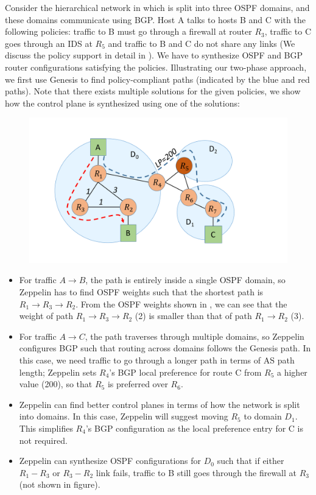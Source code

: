 Consider the hierarchical network in  which
is split into three OSPF domains, and these domains communicate
using BGP. Host A talks to hosts B and C with the following policies:
traffic to B must go through a firewall at router $R_3$, traffic to C 
goes through an IDS at $R_5$ and traffic 
to B and C do not share any links (We discuss the policy support in
detail in ). We 
have to synthesize OSPF and BGP router configurations satisfying the 
policies. Illustrating our two-phase approach, we first 
use Genesis to find policy-compliant paths (indicated by the blue and
red paths). Note that there exists multiple solutions for the given
policies, we show how the control plane is 
synthesized using one of the solutions:
\begin{figure}
	\includegraphics[width=0.75\columnwidth]{figures/example.pdf}
	\label{fig:example}
\end{figure}

\begin{itemize}
	\item
For traffic $A \rightarrow B$, the path is entirely inside
a single OSPF domain, so Zeppelin has to find OSPF weights 
such that the shortest path is $R_1 \rightarrow R_3 \rightarrow 
R_2$. From the OSPF weights shown in , 
we can see that the weight of path $R_1 
\rightarrow R_3 \rightarrow R_2$ (2) is smaller than that of path
$R_1 \rightarrow R_2$ (3). 
 	\item For traffic $A \rightarrow C$, the path traverses through 
 	multiple domains, so Zeppelin configures BGP such that 
 	routing across domains follows the Genesis path. In this case, 
 	we need traffic to go through a longer path in terms of AS path
 	length; Zeppelin sets $R_4$'s BGP local preference for route C
 	from $R_5$ a higher value (200), so that $R_5$ is 
 	preferred over $R_6$. 
 	\item Zeppelin can find better control planes in terms of how 
 	the network is split into domains. In this case,  
 	Zeppelin will suggest moving $R_5$ to domain $D_1$. 
 	This simplifies $R_4$'s BGP configuration as the local preference 
 	entry for C is not required. 
 	\item Zeppelin can synthesize OSPF configurations for $D_0$ 
 	such that if either $R_1-R_3$ or $R_3-R_2$ link fails, traffic to
 	B still goes through the firewall at $R_3$ (not shown in figure).
\end{itemize}